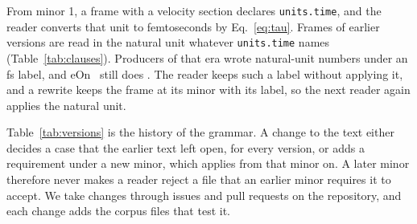 From minor 1, a frame with a velocity section declares
\texttt{units.time}, and the reader converts that unit to femtoseconds
by Eq.~\eqref{eq:tau}.
Frames of earlier versions are read in the natural unit whatever
\texttt{units.time} names (Table~\ref{tab:clauses}).
Producers of that era wrote natural-unit numbers under an fs label, and
eOn~\eOneEonVersion{} still does
\cite{rohitgoswamiTheochemuieonV3602026}.
The reader keeps such a label without applying it, and a rewrite keeps
the frame at its minor with its label, so the next reader again applies
the natural unit.

Table~\ref{tab:versions} is the history of the grammar.
A change to the text either decides a case that the earlier text left
open, for every version, or adds a requirement under a new minor, which
applies from that minor on.
A later minor therefore never makes a reader reject a file that an
earlier minor requires it to accept.
We take changes through issues and pull requests on the repository, and
each change adds the corpus files that test it.



